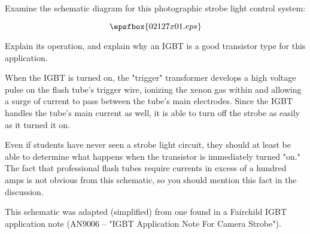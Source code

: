 

Examine the schematic diagram for this photographic strobe light control system:

$$\epsfbox{02127x01.eps}$$

Explain its operation, and explain why an IGBT is a good transistor type for this application.







When the IGBT is turned on, the "trigger" transformer develops a high voltage pulse on the flash tube's trigger wire, ionizing the xenon gas within and allowing a surge of current to pass between the tube's main electrodes.  Since the IGBT handles the tube's main current as well, it is able to turn off the strobe as easily as it turned it on.







Even if students have never seen a strobe light circuit, they should at least be able to determine what happens when the transistor is immediately turned "on."  The fact that professional flash tubes require currents in excess of a hundred amps is not obvious from this schematic, so you should mention this fact in the discussion.

This schematic was adapted (simplified) from one found in a Fairchild IGBT application note (AN9006 -- "IGBT Application Note For Camera Strobe").




